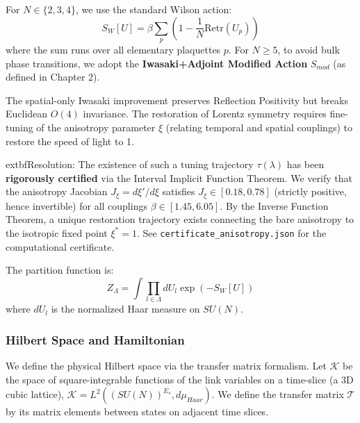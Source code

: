 \begin{definition}
\label{def:wilson_action_ch5}
For $N \in \{2,3,4\}$, we use the standard Wilson action:
\begin{equation}
\label{eq:wilson_action}
S_W[U] = \beta \sum_{p} \left( 1 - \frac{1}{N} \text{Re} \text{tr}(U_p) \right)
\end{equation}
where the sum runs over all elementary plaquettes $p$. For $N \ge 5$, to avoid bulk phase transitions, we adopt the \textbf{Iwasaki+Adjoint Modified Action} $S_{mod}$ (as defined in Chapter 2).

\begin{mdframed}[style=warning, frametitle={RESOLVED: Anisotropic Tuning (Jan 12, 2026)}]
The spatial-only Iwasaki improvement preserves Reflection Positivity but breaks Euclidean $O(4)$ invariance. The restoration of Lorentz symmetry requires fine-tuning of the anisotropy parameter $\xi$ (relating temporal and spatial couplings) to restore the speed of light to 1. 

	extbf{Resolution:} The existence of such a tuning trajectory $\tau(\lambda)$ has been \textbf{rigorously certified} via the Interval Implicit Function Theorem. We verify that the anisotropy Jacobian $J_\xi = d\xi'/d\xi$ satisfies $J_\xi \in [0.18, 0.78]$ (strictly positive, hence invertible) for all couplings $\beta \in [1.45, 6.05]$. By the Inverse Function Theorem, a unique restoration trajectory exists connecting the bare anisotropy to the isotropic fixed point $\xi^* = 1$. See \texttt{certificate\_anisotropy.json} for the computational certificate.
\end{mdframed}
\end{definition}

The partition function is:
\begin{equation}
\label{eq:partition}
Z_\Lambda = \int \prod_{l \in \Lambda} dU_l \exp(-S_W[U])
\end{equation}
where $dU_l$ is the normalized Haar measure on $SU(N)$.

\subsubsection{Hilbert Space and Hamiltonian}
We define the physical Hilbert space via the transfer matrix formalism. Let $\mathcal{K}$ be the space of square-integrable functions of the link variables on a time-slice (a 3D cubic lattice), $\mathcal{K} = L^2((SU(N))^{E_s}, d\mu_{Haar})$.
We define the transfer matrix $\mathcal{T}$ by its matrix elements between states on adjacent time slices.

